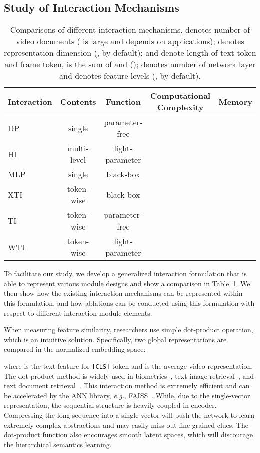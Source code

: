 \documentclass[runningheads]{llncs}
\begin{document}
\subsection{Study of Interaction Mechanisms }
\begin{table}[t]
\centering
\caption{Comparisons of different interaction mechanisms.  denotes number of video documents ( is large and depends on applications);  denotes representation dimension (, by default);  and  denote length of text token and frame token,  is the sum of  and  ();  denotes number of network layer and  denotes feature levels (, by default).}
\begin{tabular}{l|c|c| c|c}
\toprule
Interaction & Contents    & Function          & Computational Complexity           & Memory   \\
\hline
DP   & single  & parameter-free       &               &   \\
HI                   & multi-level    & light-parameter &              &  \\
MLP                   & single    & black-box            &         &   \\
XTI      & token-wise   & black-box            &  &  \\
TI                    & token-wise   & parameter-free       &             &  \\
WTI                   & token-wise   & light-parameter &             & \\
\bottomrule
\end{tabular}
\label{tab:cmp}
\end{table}

To facilitate our study, we develop a generalized interaction formulation that is able to represent various module designs and show a comparison in Table~\ref{tab:cmp}.
We then show how the existing interaction mechanisms can be represented within this formulation, and how ablations can be conducted using this formulation with respect to different interaction module elements.

When measuring feature similarity, researchers use simple dot-product operation, which is an intuitive solution.
Specifically, two global representations are compared in the  normalized embedding space:

where  is the text feature for \texttt{[CLS]} token and  is the average video representation. 
The dot-product method is widely used in biometrics~\cite{arcface,reid}, text-image retrieval~\cite{flickr30k}, and text document retrieval~\cite{dssm}.
This interaction method is extremely efficient and can be accelerated by the ANN library, \textit{e.g.}, FAISS~\cite{faiss}.
While, due to the single-vector representation, the sequential structure is heavily coupled in encoder. 
Compressing the long sequence into a single vector will push the network to learn extremely complex abstractions and may easily miss out fine-grained clues. 
The dot-product function also encourages smooth latent spaces, which will discourage the hierarchical semantics learning.
\end{document}
